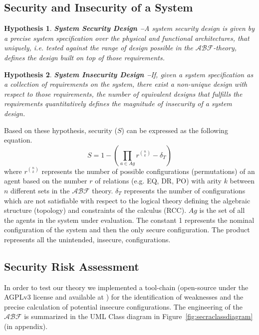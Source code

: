 \documentclass[conference]{IEEEtran}
\newcommand{\assertionRegion}{\mathcal{A}}
\newcommand{\beliefRegion}{\mathcal{B}}
\newcommand{\factRegion}{\mathcal{F}}
\newcommand{\abftheory}{\assertionRegion\beliefRegion\factRegion}
\newtheorem{hypothesis}{Hypothesis}%
\begin{document}
\subsection{Security and Insecurity of a System}
\begin{hypothesis}{\bf System Security Design --}\label{hyp:security}
	A system security design is given by a precise system 
	specification over the physical and functional architectures, that
	uniquely, i.e.  tested against the range of design possible in the
	$\abftheory$-theory, defines the design built on top of those
	requirements.
\end{hypothesis}

\begin{hypothesis}{\bf System Insecurity Design --}\label{hyp:insecurity}
	If, given a system specification as a collection of
	requirements on the system, there exist
	a non-unique design with respect to those requirements, the number of
	equivalent designs that fulfills the requirements quantitatively
	defines the magnitude of insecurity of a system design.
\end{hypothesis}

Based on these hypothesis, security ($S$) can be expressed as the following equation.
\begin{displaymath}
	S=1-(\prod_{a\in Ag} r^{\binom{n}{k}}-\delta_T)
\end{displaymath}
where $r^{\binom{n}{k}}$ represents the number of possible configurations (permutations) 
of an agent based on the number $r$ of relations (e.g. EQ, DR, PO) with arity $k$ between
$n$ different sets in the $\abftheory$ theory. $\delta_T$ represents the 
number of configurations which are not satisfiable with respect to the logical theory
defining the 
algebraic structure (topology) and constraints of the calculus (RCC). $Ag$ is the 
set of all the agents in the system under evaluation.
The constant 1 represents the nominal configuration of the system and then the
only secure configuration. The product represents all the unintended, insecure, configurations.

\subsection{Security Risk Assessment}\label{sec:secra}
In order to test our theory we implemented a tool-chain (open-source under the
AGPLv3 license and available at \autocite{cybersecurityGitHubRepo}) for the
identification of weaknesses and the precise calculation of potential insecure
configurations. The engineering of the $\abftheory$ is summarized in the UML
Class diagram in Figure~\ref{fig:secraclassdiagram} (in appendix). 
\end{document}
